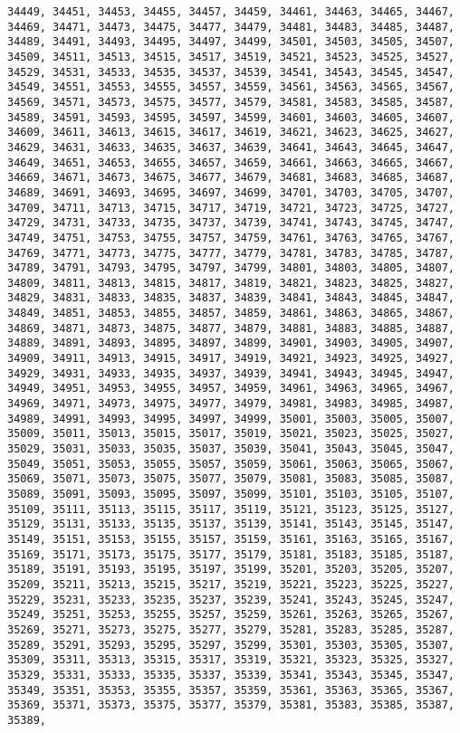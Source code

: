 \documentclass[11pt]{article}
\begin{document}
\begin{Verbatim}[commandchars=\\\{\}]
34449, 34451, 34453, 34455, 34457, 34459, 34461, 34463, 34465, 34467, 34469, 34471, 34473, 34475, 34477, 34479, 34481, 34483, 34485, 34487, 34489, 34491, 34493, 34495, 34497, 34499, 34501, 34503, 34505, 34507, 34509, 34511, 34513, 34515, 34517, 34519, 34521, 34523, 34525, 34527, 34529, 34531, 34533, 34535, 34537, 34539, 34541, 34543, 34545, 34547, 34549, 34551, 34553, 34555, 34557, 34559, 34561, 34563, 34565, 34567, 34569, 34571, 34573, 34575, 34577, 34579, 34581, 34583, 34585, 34587, 34589, 34591, 34593, 34595, 34597, 34599, 34601, 34603, 34605, 34607, 34609, 34611, 34613, 34615, 34617, 34619, 34621, 34623, 34625, 34627, 34629, 34631, 34633, 34635, 34637, 34639, 34641, 34643, 34645, 34647, 34649, 34651, 34653, 34655, 34657, 34659, 34661, 34663, 34665, 34667, 34669, 34671, 34673, 34675, 34677, 34679, 34681, 34683, 34685, 34687, 34689, 34691, 34693, 34695, 34697, 34699, 34701, 34703, 34705, 34707, 34709, 34711, 34713, 34715, 34717, 34719, 34721, 34723, 34725, 34727, 34729, 34731, 34733, 34735, 34737, 34739, 34741, 34743, 34745, 34747, 34749, 34751, 34753, 34755, 34757, 34759, 34761, 34763, 34765, 34767, 34769, 34771, 34773, 34775, 34777, 34779, 34781, 34783, 34785, 34787, 34789, 34791, 34793, 34795, 34797, 34799, 34801, 34803, 34805, 34807, 34809, 34811, 34813, 34815, 34817, 34819, 34821, 34823, 34825, 34827, 34829, 34831, 34833, 34835, 34837, 34839, 34841, 34843, 34845, 34847, 34849, 34851, 34853, 34855, 34857, 34859, 34861, 34863, 34865, 34867, 34869, 34871, 34873, 34875, 34877, 34879, 34881, 34883, 34885, 34887, 34889, 34891, 34893, 34895, 34897, 34899, 34901, 34903, 34905, 34907, 34909, 34911, 34913, 34915, 34917, 34919, 34921, 34923, 34925, 34927, 34929, 34931, 34933, 34935, 34937, 34939, 34941, 34943, 34945, 34947, 34949, 34951, 34953, 34955, 34957, 34959, 34961, 34963, 34965, 34967, 34969, 34971, 34973, 34975, 34977, 34979, 34981, 34983, 34985, 34987, 34989, 34991, 34993, 34995, 34997, 34999, 35001, 35003, 35005, 35007, 35009, 35011, 35013, 35015, 35017, 35019, 35021, 35023, 35025, 35027, 35029, 35031, 35033, 35035, 35037, 35039, 35041, 35043, 35045, 35047, 35049, 35051, 35053, 35055, 35057, 35059, 35061, 35063, 35065, 35067, 35069, 35071, 35073, 35075, 35077, 35079, 35081, 35083, 35085, 35087, 35089, 35091, 35093, 35095, 35097, 35099, 35101, 35103, 35105, 35107, 35109, 35111, 35113, 35115, 35117, 35119, 35121, 35123, 35125, 35127, 35129, 35131, 35133, 35135, 35137, 35139, 35141, 35143, 35145, 35147, 35149, 35151, 35153, 35155, 35157, 35159, 35161, 35163, 35165, 35167, 35169, 35171, 35173, 35175, 35177, 35179, 35181, 35183, 35185, 35187, 35189, 35191, 35193, 35195, 35197, 35199, 35201, 35203, 35205, 35207, 35209, 35211, 35213, 35215, 35217, 35219, 35221, 35223, 35225, 35227, 35229, 35231, 35233, 35235, 35237, 35239, 35241, 35243, 35245, 35247, 35249, 35251, 35253, 35255, 35257, 35259, 35261, 35263, 35265, 35267, 35269, 35271, 35273, 35275, 35277, 35279, 35281, 35283, 35285, 35287, 35289, 35291, 35293, 35295, 35297, 35299, 35301, 35303, 35305, 35307, 35309, 35311, 35313, 35315, 35317, 35319, 35321, 35323, 35325, 35327, 35329, 35331, 35333, 35335, 35337, 35339, 35341, 35343, 35345, 35347, 35349, 35351, 35353, 35355, 35357, 35359, 35361, 35363, 35365, 35367, 35369, 35371, 35373, 35375, 35377, 35379, 35381, 35383, 35385, 35387, 35389, 
\end{Verbatim}
\end{document}
